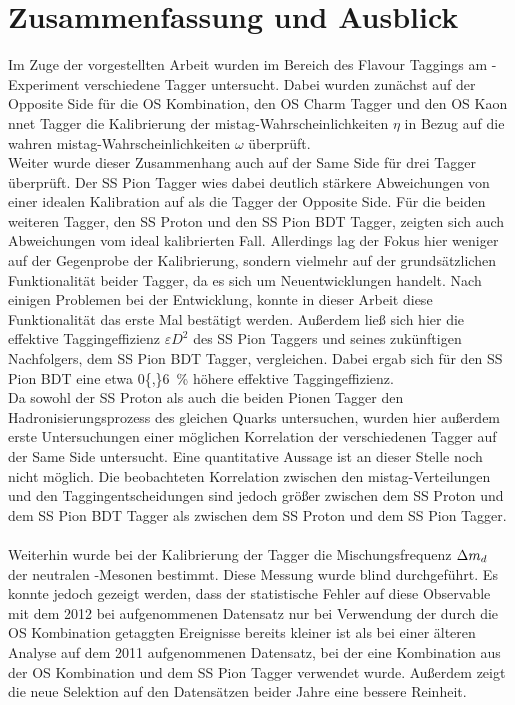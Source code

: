 \chapter{Zusammenfassung und Ausblick}

Im Zuge der vorgestellten Arbeit wurden im Bereich des Flavour Taggings am \lhcb-Experiment verschiedene Tagger untersucht. Dabei wurden zunächst auf der Opposite Side für die OS Kombination, den OS Charm Tagger und den OS Kaon nnet Tagger die Kalibrierung der mistag-Wahrscheinlichkeiten $\eta$ in Bezug auf die wahren mistag-Wahrscheinlichkeiten $\omega$ überprüft.\\
Weiter wurde dieser Zusammenhang auch auf der Same Side für drei Tagger überprüft. Der SS Pion Tagger wies dabei deutlich stärkere Abweichungen von einer idealen Kalibration auf als die Tagger der Opposite Side. Für die beiden weiteren Tagger, den SS Proton und den SS Pion BDT Tagger, zeigten sich auch Abweichungen vom ideal kalibrierten Fall. Allerdings lag der Fokus hier weniger auf der Gegenprobe der Kalibrierung, sondern vielmehr auf der grundsätzlichen Funktionalität beider Tagger, da es sich um Neuentwicklungen handelt. Nach einigen Problemen bei der Entwicklung, konnte in dieser Arbeit diese Funktionalität das erste Mal bestätigt werden. Außerdem ließ sich hier die effektive Taggingeffizienz $\varepsilon D^2$ des SS Pion Taggers und  seines zukünftigen Nachfolgers, dem SS Pion BDT Tagger, vergleichen. Dabei ergab sich für den SS Pion BDT eine etwa \SI{0{,}6}{\%} höhere effektive Taggingeffizienz.\\
Da sowohl der SS Proton als auch die beiden Pionen Tagger den Hadronisierungsprozess des gleichen Quarks untersuchen, wurden hier außerdem erste Untersuchungen einer möglichen Korrelation der verschiedenen Tagger auf der Same Side untersucht. Eine quantitative Aussage ist an dieser Stelle noch nicht möglich. Die beobachteten Korrelation zwischen den mistag-Verteilungen und den Taggingentscheidungen sind jedoch größer zwischen dem SS Proton und dem SS Pion BDT Tagger als zwischen dem SS Proton und dem SS Pion Tagger. \\ 
\\
Weiterhin wurde bei der Kalibrierung der Tagger die Mischungsfrequenz ${\Delta m_{{d}}}$  der neutralen \B-Mesonen bestimmt. Diese Messung wurde blind durchgeführt. Es konnte jedoch gezeigt werden, dass der statistische Fehler auf diese Observable mit dem \num{2012} bei \lhcb aufgenommenen Datensatz nur bei Verwendung der durch die OS Kombination getaggten Ereignisse bereits kleiner ist als bei einer älteren Analyse auf dem \num{2011} aufgenommenen Datensatz, bei der eine Kombination aus der OS Kombination und dem SS Pion Tagger verwendet wurde. Außerdem zeigt die neue Selektion auf den Datensätzen beider Jahre eine bessere Reinheit. \\
